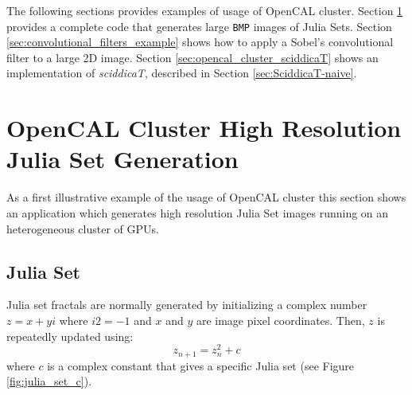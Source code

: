 The following sections provides examples of usage of OpenCAL cluster. Section \ref{sec:opencal_julia} provides a complete code that generates large \texttt{BMP} images of Julia Sets.
Section \ref{sec:convolutional_filters_example} shows how to apply a Sobel's convolutional filter to a large 2D image.
Section \ref{sec:opencal_cluster_sciddicaT} shows an implementation of \textit{sciddicaT}, described in Section \ref{sec:SciddicaT-naive}. 
\section{OpenCAL Cluster High Resolution Julia Set Generation}
\label{sec:opencal_julia}
As a first illustrative example of the usage of OpenCAL cluster this section shows an application which generates high resolution Julia Set images running on an heterogeneous cluster of GPUs.

\subsection{Julia Set}
\label{sec:julia_math}
Julia set fractals are normally generated by initializing a complex number  $z = x + yi$  where  $i2 = -1$  and $x$ and $y$ are image pixel coordinates. Then, $z$ is repeatedly updated using:
\[ 
 z_{n+1} = z_n^2 + c
\]  
where $c$ is a complex constant that gives a specific Julia set (see Figure \ref{fig:julia_set_c}).

